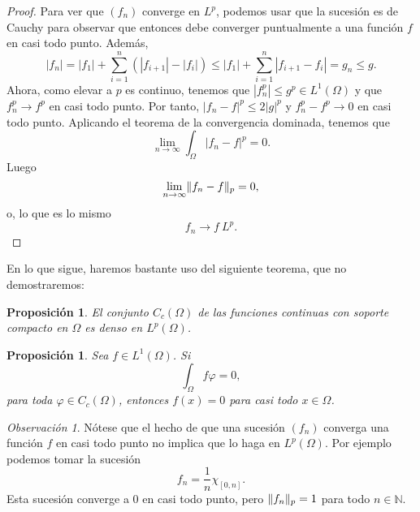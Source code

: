 \documentclass[12pt,a4paper]{book}
\DeclarePairedDelimiter\norm{\lVert}{\rVert}
\newtheorem{prop}[thm]{Proposición}
\theoremstyle{definition} \newtheorem{defn}[thm]{Definición}
\theoremstyle{definition} \newtheorem{ejemplo}[thm]{Ejemplo}
\theoremstyle{definition} \newtheorem{ejercicio}[thm]{Ejercicio}
\theoremstyle{remark} \newtheorem*{obs}{Observación}
\newcommand{\NN}{\mathbb{N}}
\begin{document}
\begin{proof}
Para ver que $(f_n)$ converge en $L^p$, podemos usar que la sucesión es de Cauchy para observar que entonces debe converger puntualmente a una función $f$ en casi todo punto. Además,
\begin{equation*}
  |f_n|=|f_1|+\sum_{i=1}^n(|f_{i+1}|-|f_i|) \leq |f_1| + \sum_{i=1}^n |f_{i+1}-f_i| = g_n \leq g.
\end{equation*}
Ahora, como elevar a $p$ es continuo, tenemos que $|f_n^p | \leq g^p \in L^1(\Omega)$ y que $f_n^p \rightarrow f^p$ en casi todo punto. Por tanto, $|f_n-f|^p\leq 2 |g|^p$ y $f_n^p-f^p \rightarrow 0$ en casi todo punto. Aplicando el teorema de la convergencia dominada, tenemos que
  \begin{equation*}
    \lim_{n\rightarrow \infty} \int_{\Omega} |f_n-f|^p= 0.
  \end{equation*}
  Luego
  \begin{equation*}
    \lim_{n\rightarrow \infty}\norm{f_n-f}_p = 0,
  \end{equation*}
  o, lo que es lo mismo
  \begin{equation*}
    f_n \rightarrow f \ L^p.
  \end{equation*}
\end{proof}

En lo que sigue, haremos bastante uso del siguiente teorema, que no demostraremos:
\begin{prop}\label{densidad1}
  El conjunto $C_c(\Omega)$ de las funciones continuas con soporte compacto en $\Omega$ es denso en $L^p(\Omega)$.
\end{prop}

\begin{prop}\label{integralnula}
  Sea $f\in L^1(\Omega)$. Si 
  \begin{equation*}
    \int_\Omega f \varphi =0,
  \end{equation*}
  para toda $\varphi\in C_c(\Omega)$, entonces $f(x)=0$ para casi todo $x\in \Omega$.
\end{prop}

\begin{obs}
  Nótese que el hecho de que una sucesión $(f_n)$ converga una función $f$ en casi todo punto no implica que lo haga en $L^p(\Omega)$. Por ejemplo podemos tomar la sucesión 
  \begin{equation*}
    f_n=\frac{1}{n}\chi_{[0,n]}.
  \end{equation*}
  Esta sucesión converge a $0$ en casi todo punto, pero $\norm{f_n}_p=1$ para todo $n\in \NN$.
\end{obs}
  
\end{document}

